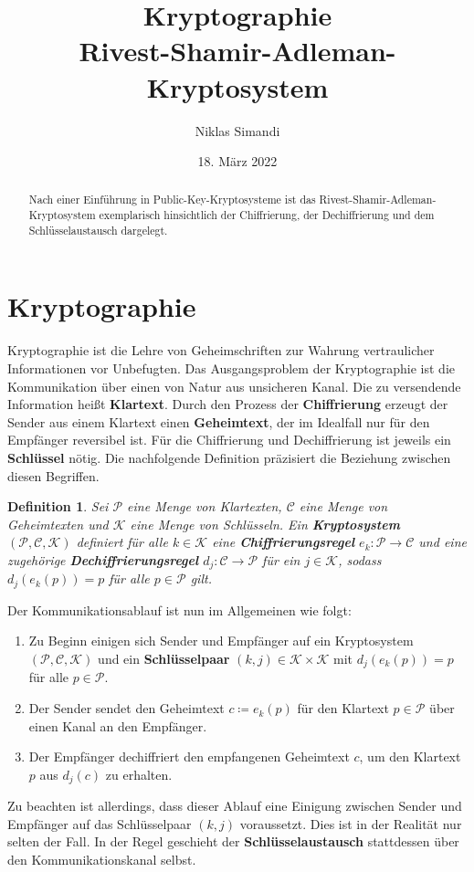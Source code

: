 \documentclass{paper}
\title{Kryptographie \\ Rivest-Shamir-Adleman-Kryptosystem}
\author{Niklas Simandi}
\date{18. März 2022}
\theoremstyle{classic}
\newtheorem{definition}{Definition}[section]
\begin{document}
\maketitle

\begin{abstract}\sloppy\noindent
Nach einer Einführung in Public-Key-Kryptosysteme ist das Rivest-Shamir-Adleman-Kryptosystem exemplarisch hinsichtlich der Chiffrierung, der Dechiffrierung und dem Schlüsselaustausch dargelegt.
\end{abstract}

\tableofcontents

\newpage


\section{Kryptographie}

Kryptographie ist die Lehre von Geheimschriften zur Wahrung vertraulicher Informationen vor Unbefugten. Das Ausgangsproblem der Kryptographie ist die Kommunikation über einen von Natur aus unsicheren Kanal. Die zu versendende Information heißt \textbf{Klartext}. Durch den Prozess der \textbf{Chiffrierung} erzeugt der Sender aus einem Klartext einen \textbf{Geheimtext}, der im Idealfall nur für den Empfänger reversibel ist. Für die Chiffrierung und Dechiffrierung ist jeweils ein \textbf{Schlüssel} nötig. Die nachfolgende Definition präzisiert die Beziehung zwischen diesen Begriffen.
\begin{definition}
\label{def:1.1}
Sei \(\mathcal{P}\) eine Menge von Klartexten, \(\mathcal{C}\) eine Menge von Geheimtexten und \(\mathcal{K}\) eine Menge von Schlüsseln. Ein \textbf{Kryptosystem} \((\mathcal{P},\mathcal{C},\mathcal{K})\) definiert für alle \(k \in \mathcal{K}\) eine \textbf{Chiffrierungsregel} \(e_k : \mathcal{P} \rightarrow \mathcal{C}\) und eine zugehörige \textbf{Dechiffrierungsregel} \(d_j : \mathcal{C} \rightarrow \mathcal{P}\) für ein \(j \in \mathcal{K}\), sodass \(d_j(e_k(p)) = p\) für alle \(p \in \mathcal{P}\) gilt.
\end{definition}
Der Kommunikationsablauf ist nun im Allgemeinen wie folgt:
\begin{enumerate}
\item Zu Beginn einigen sich Sender und Empfänger auf ein Kryptosystem \((\mathcal{P},\mathcal{C},\mathcal{K})\) und ein \textbf{Schlüsselpaar} \((k,j) \in \mathcal{K} \times \mathcal{K}\) mit \(d_j(e_k(p)) = p\) für alle \(p \in \mathcal{P}\).
\item Der Sender sendet den Geheimtext \(c \coloneqq e_k(p)\) für den Klartext \(p \in \mathcal{P}\) über einen Kanal an den Empfänger.
\item Der Empfänger dechiffriert den empfangenen Geheimtext \(c\), um den Klartext \(p\) aus \(d_j(c)\) zu erhalten.
\end{enumerate}
Zu beachten ist allerdings, dass dieser Ablauf eine Einigung zwischen Sender und Empfänger auf das Schlüsselpaar \((k,j)\) voraussetzt. Dies ist in der Realität nur selten der Fall. In der Regel geschieht der \textbf{Schlüsselaustausch} stattdessen über den Kommunikationskanal selbst.
\end{document}
